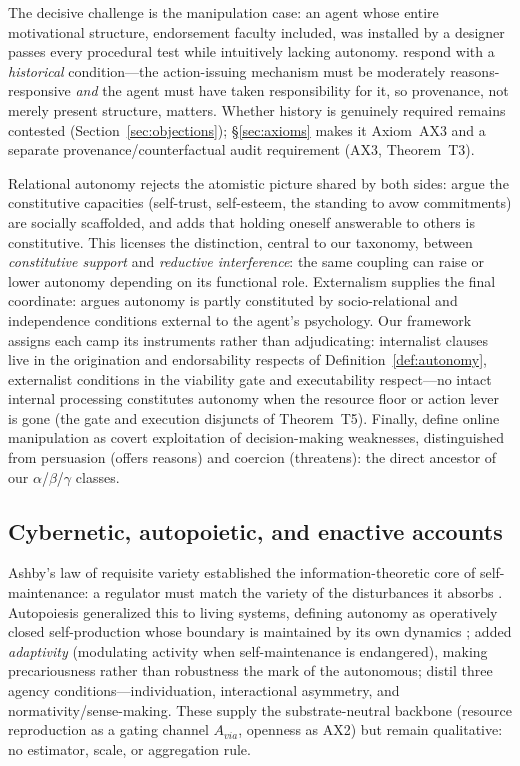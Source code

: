 The decisive challenge is the manipulation case: an agent whose entire
motivational structure, endorsement faculty included, was installed by a
designer passes every procedural test while intuitively lacking autonomy.
\citet{fischer_ravizza1998} respond with a \emph{historical} condition---the
action-issuing mechanism must be moderately reasons-responsive \emph{and} the
agent must have taken responsibility for it, so provenance, not merely present
structure, matters. Whether history is genuinely required remains contested
(Section~\ref{sec:objections}); \S\ref{sec:axioms} makes it Axiom~AX3 and a
separate provenance/counterfactual audit requirement (AX3, Theorem~T3).

Relational autonomy rejects the atomistic picture shared by both sides:
\citet{mackenzie_stoljar2000} argue the constitutive capacities (self-trust,
self-esteem, the standing to avow commitments) are socially scaffolded, and
\citet{westlund2009} adds that holding oneself answerable to others is
constitutive. This licenses the distinction, central to our taxonomy, between
\emph{constitutive support} and \emph{reductive interference}: the same coupling
can raise or lower autonomy depending on its functional role. Externalism
supplies the final coordinate: \citet{oshana1998} argues autonomy is partly
constituted by socio-relational and independence conditions external to the
agent's psychology. Our framework assigns each camp its instruments rather than
adjudicating: internalist clauses live in the origination and endorsability
respects of Definition~\ref{def:autonomy}, externalist conditions in the
viability gate and executability respect---no intact internal processing
constitutes autonomy when the resource floor or action lever is gone (the gate
and execution disjuncts of Theorem~T5). Finally, \citet{sussner2019} define
online manipulation as covert exploitation of decision-making weaknesses,
distinguished from persuasion (offers reasons) and coercion (threatens): the
direct ancestor of our $\alpha$/$\beta$/$\gamma$ classes.

\subsection{Cybernetic, autopoietic, and enactive accounts}\label{rw:bio}

Ashby's law of requisite variety established the information-theoretic core of
self-maintenance: a regulator must match the variety of the disturbances it
absorbs \citep{ashby1956}. Autopoiesis generalized this to living systems,
defining autonomy as operatively closed self-production whose boundary is
maintained by its own dynamics \citep{maturana_varela1980};
\citet{di_paolo2005} added \emph{adaptivity} (modulating activity when
self-maintenance is endangered), making precariousness rather than robustness
the mark of the autonomous; \citet{barandiaran2009} distil three agency
conditions---individuation, interactional asymmetry, and normativity/sense-making.
These supply the substrate-neutral backbone (resource reproduction as a gating
channel $A_{via}$, openness as AX2) but remain qualitative: no estimator, scale,
or aggregation rule.

